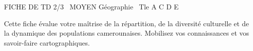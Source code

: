 \documentclass[11pt]{article}
\begin{document}
\begin{tcolorbox}[enhanced,colback=popink,colframe=popink,arc=10pt,boxrule=0pt,left=12pt,right=12pt,top=9pt,bottom=9pt]
{\color{white}\popxbold\small FICHE DE TD 2/3 \textbullet\ MOYEN \hfill Géographie \textbullet\ Tle A C D E\par}
\end{tcolorbox}
\vspace{4pt}
Cette fiche évalue votre maîtrise de la répartition, de la diversité culturelle et de la dynamique des populations camerounaises. Mobilisez vos connaissances et vos savoir-faire cartographiques.
\end{document}
